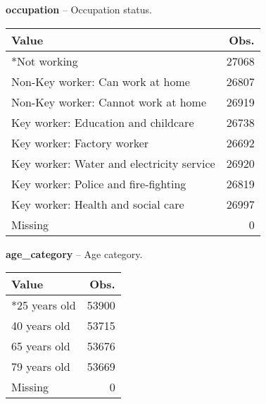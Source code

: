 \documentclass[
]{article}
\begin{document}
\textbf{occupation} -- Occupation status.

\begin{longtable}[]{@{}lr@{}}
\toprule
Value & Obs.\tabularnewline
\midrule
\endhead
*Not working & 27068\tabularnewline
Non-Key worker: Can work at home & 26807\tabularnewline
Non-Key worker: Cannot work at home & 26919\tabularnewline
Key worker: Education and childcare & 26738\tabularnewline
Key worker: Factory worker & 26692\tabularnewline
Key worker: Water and electricity service & 26920\tabularnewline
Key worker: Police and fire-fighting & 26819\tabularnewline
Key worker: Health and social care & 26997\tabularnewline
Missing & 0\tabularnewline
\bottomrule
\end{longtable}

\newpage

\textbf{age\_category} -- Age category.

\begin{longtable}[]{@{}lr@{}}
\toprule
Value & Obs.\tabularnewline
\midrule
\endhead
*25 years old & 53900\tabularnewline
40 years old & 53715\tabularnewline
65 years old & 53676\tabularnewline
79 years old & 53669\tabularnewline
Missing & 0\tabularnewline
\bottomrule
\end{longtable}
\end{document}
